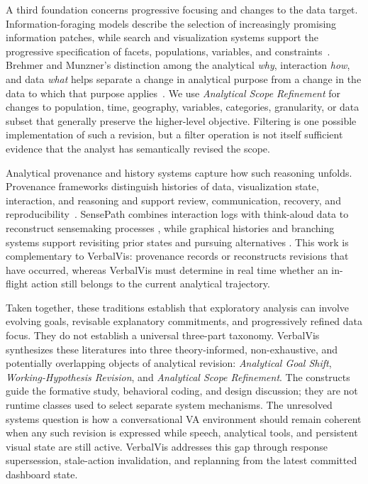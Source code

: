 \documentclass[journal]{IEEEtran}
\begin{document}
A third foundation concerns progressive focusing and changes to the data
target. Information-foraging models describe the selection of increasingly
promising information patches, while search and visualization systems support
the progressive specification of facets, populations, variables, and
constraints~\cite{pirolli1999information,bates1989berrypicking,
vakkari2001changes}. Brehmer and Munzner's distinction among the analytical
\emph{why}, interaction \emph{how}, and data \emph{what} helps separate a
change in analytical purpose from a change in the data to which that purpose
applies~\cite{brehmer2013multi}. We use \emph{Analytical Scope Refinement} for
changes to population, time, geography, variables, categories, granularity, or
data subset that generally preserve the higher-level objective. Filtering is
one possible implementation of such a revision, but a filter operation is not
itself sufficient evidence that the analyst has semantically revised the
scope.

Analytical provenance and history systems capture how such reasoning unfolds.
Provenance frameworks distinguish histories of data, visualization state,
interaction, and reasoning and support review, communication, recovery, and
reproducibility~\cite{ragan2016characterizing}. SensePath combines interaction
logs with think-aloud data to reconstruct sensemaking processes
\cite{nguyen2016sensepath}, while graphical histories and branching systems
support revisiting prior states and pursuing alternatives
\cite{heer2008graphical,derthick2001branching}. This work is complementary to
VerbalVis: provenance records or reconstructs revisions that have occurred,
whereas VerbalVis must determine in real time whether an in-flight action still
belongs to the current analytical trajectory.

Taken together, these traditions establish that exploratory analysis can
involve evolving goals, revisable explanatory commitments, and progressively
refined data focus. They do not establish a universal three-part taxonomy.
VerbalVis synthesizes these literatures into three theory-informed,
non-exhaustive, and potentially overlapping objects of analytical revision:
\emph{Analytical Goal Shift}, \emph{Working-Hypothesis Revision}, and
\emph{Analytical Scope Refinement}. The constructs guide the formative study,
behavioral coding, and design discussion; they are not runtime classes used to
select separate system mechanisms. The unresolved systems question is how a
conversational VA environment should remain coherent when any such revision is
expressed while speech, analytical tools, and persistent visual state are
still active. VerbalVis addresses this gap through response supersession,
stale-action invalidation, and replanning from the latest committed dashboard
state.
\end{document}
